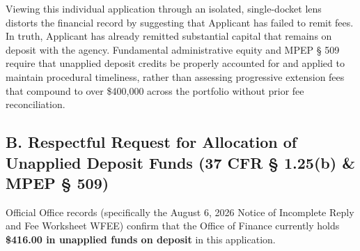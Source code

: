 \documentclass[11pt,letterpaper]{article}
\begin{document}
Viewing this individual application through an isolated, single-docket lens distorts the financial record by suggesting that Applicant has failed to remit fees. In truth, Applicant has already remitted substantial capital that remains on deposit with the agency. Fundamental administrative equity and MPEP \S{} 509 require that unapplied deposit credits be properly accounted for and applied to maintain procedural timeliness, rather than assessing progressive extension fees that compound to over \$400,000 across the portfolio without prior fee reconciliation.

\subsection*{B. Respectful Request for Allocation of Unapplied Deposit Funds (37 CFR \S{} 1.25(b) \& MPEP \S{} 509)}
Official Office records (specifically the August 6, 2026 Notice of Incomplete Reply and Fee Worksheet WFEE) confirm that the Office of Finance currently holds \textbf{\$416.00 in unapplied funds on deposit} in this application.
\end{document}
